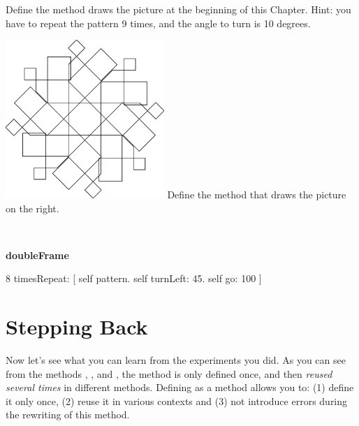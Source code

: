 \begin{exonofig}
Define the method   draws the picture at the beginning of this Chapter. Hint: you have to repeat the pattern 9 times, and the angle to turn is 10 degrees.

\end{exonofig}



\begin{exofigwithsize}[0.5]{\includegraphics[width=6cm]{compArtNouveauGiantScr}}
Define the method  that draws the picture on the right. 

\

\begin{nalltt}
\textbf{doubleFrame}

    8 timesRepeat: 
                   [ self pattern. 
                   self turnLeft: 45.
                   self go: 100 ]
\end{nalltt}
\end{exofigwithsize}




\section{Stepping Back}
Now let's see what you can learn from the experiments you did. As you can see from the methods , , and , the method  is only defined once, and then \emph{reused several times} in different methods. Defining  as a method allows you to: (1) define it only once, (2) reuse it in various contexts and (3) not introduce errors during the rewriting of this method. 

